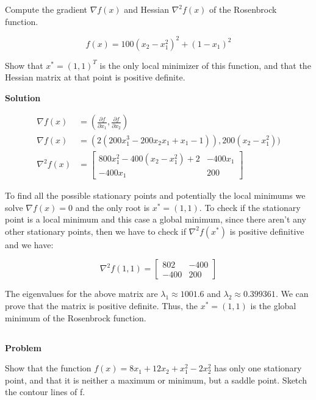 \documentclass[a4paper,11pt]{article}
\numberwithin{equation}{section} %
\begin{document}
Compute the gradient $\nabla f(x)$ and Hessian $\nabla^2 f(x)$ of the Rosenbrock function.

\begin{equation}
    f(x) = 100(x_2 -x_1^2)^2 + (1-x_1)^2 
\end{equation}

Show that $x^{\ast} = (1, 1)^{T}$ is the only local minimizer of this function, and that the Hessian matrix at that point is positive definite.


\textbf{Solution}

\begin{align}
    \nabla f(x) &= (\frac{\partial f}{\partial x_1}, \frac{\partial f}{\partial x_2}) \\
    \nabla f(x) &= (2(200x_1^3 -200x_2x_1 + x_1- 1)), 200(x_2 - x_1^2)) \\
    \nabla^2 f(x) &= 
    \begin{bmatrix}
    800x_1^2 - 400(x_2 - x_1^2) +2 & -400x_1 \\
    -400x_1 & 200
    \end{bmatrix}
\end{align}

To find all the possible stationary points and potentially the local minimums we solve $\nabla f(x) =0$ and the only root is $x^{*} = (1,1)$. To check if the stationary point is a local minimum and this case a global minimum, since there aren't any other stationary points, then we have to check if $\nabla^2 f(x^{*})$ is positive definitive and we have:

\begin{equation}
    \nabla^2 f(1,1) = 
    \begin{bmatrix}
        802 & -400 \\
        -400 & 200
    \end{bmatrix}
\end{equation}

The eigenvalues for the above matrix are $\lambda_1 \approx 1001.6$ and $\lambda_2 \approx 0.399361$. We can prove that the matrix is positive definite. Thus, the $x^{*} = (1,1)$ is the global minimum of the Rosenbrock function.

\subsection{}

\textbf{Problem}

Show that the function $f(x) = 8x_1 + 12x_2 + x_1^2 - 2x_2^2$ has only one stationary
point, and that it is neither a maximum or minimum, but a saddle point. Sketch the contour
lines of f.
\end{document}
